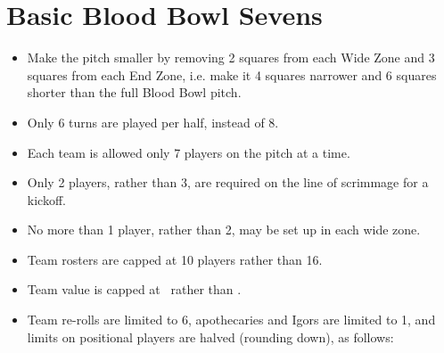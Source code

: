 \section{Basic Blood Bowl Sevens}

\begin{itemize}
\item Make the pitch smaller by removing 2 squares from each Wide Zone and 3 squares from each End Zone, i.e. make it 4 squares narrower and 6 squares shorter than the full Blood Bowl pitch.
\item Only 6 turns are played per half, instead of 8.
\item Each team is allowed only 7 players on the pitch at a time.
\item Only 2 players, rather than 3, are required on the line of scrimmage for a kickoff.
\item No more than 1 player, rather than 2, may be set up in each wide zone.
\item Team rosters are capped at 10 players rather than 16.
\item Team value is capped at \TVsevens\ rather than \TV .
\item Team re-rolls are limited to 6, apothecaries and Igors are limited to 1, and limits on positional players are halved (rounding down), as follows:
\end{itemize}

